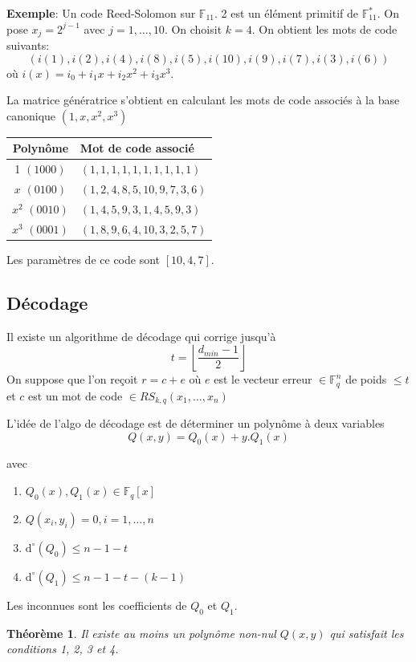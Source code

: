 \documentclass[a4paper,10pt,twocolumn]{article}
\theoremstyle{break}
\newcommand{\F}{\mathbb{F}}
\newcommand{\dg}[1]{\mathrm{d}^\circ(#1)}
\newtheorem{myth}{Théorème}
\newenvironment{note}[1]
{\textbf{#1}:}
{}
\newenvironment{exemple}
{\begin{note}{Exemple}}
{\end{note}}
\begin{document}
\begin{exemple}
 Un code Reed-Solomon sur $\F_{11}$. 2 est un élément primitif de $\F_{11}^*$. On pose $x_j=2^{j-1}$
 avec $j=1,\ldots, 10$. On choisit $k=4$. On obtient les mots de code suivants:
  $$ (i(1), i(2), i(4), i(8), i(5), i(10), i(9), i(7), i(3), i(6)) $$
 où $i(x) = i_0 + i_1x+ i_2x^2 + i_3x^3$.

 La matrice génératrice s'obtient en calculant les mots de code associés à la base canonique $(1,x,x^2,x^3)$
 \begin{center}
 \begin{tabular}{|c|l|}
 \hline 
 Polynôme & Mot de code associé \\
 \hline %
 1 $(1000)$ & $(1,1,1,1,1,1,1,1,1,1)$ \\
 $x$ $(0100)$ & $(1,2,4,8,5,10,9,7,3,6)$ \\
 $x^2$ $(0010)$ & $(1,4,5,9,3,1,4,5,9,3)$ \\
 $x^3$ $(0001)$ & $(1,8,9,6,4,10,3,2,5,7)$ \\
 \hline
 \end{tabular}
 \end{center}
 Les paramètres de ce code sont $[10,4,7]$.
\end{exemple}

\subsection{Décodage}
Il existe un algorithme de décodage qui corrige jusqu'à 
$$ t = \left\lfloor \frac{d_{min}-1}{2} \right\rfloor $$
On suppose que l'on reçoit $r=c+e$ où $e$ est le vecteur erreur $\in \F_q^n$ de poids $\le t$ 
et $c$ est un mot de code $\in RS_{k,q}(x_1, \ldots, x_n)$

L'idée de l'algo de décodage est de déterminer un polynôme à deux variables
$$ Q(x,y) = Q_0(x) + y.Q_1(x) $$

avec
\begin{enumerate}
 \item $Q_0(x), Q_1(x) \in \F_q[x]$
 \item $Q(x_i, y_i) = 0, i=1, \ldots, n$
 \item $\dg{Q_0} \le n - 1 - t$
 \item $\dg{Q_1} \le n - 1 - t - (k-1)$
\end{enumerate}
Les inconnues sont les coefficients de $Q_0$ et $Q_1$.

\begin{myth}
 Il existe au moins un polynôme non-nul $Q(x,y)$ qui satisfait les conditions 1, 2, 3 et 4.
\end{myth}
\end{document}
